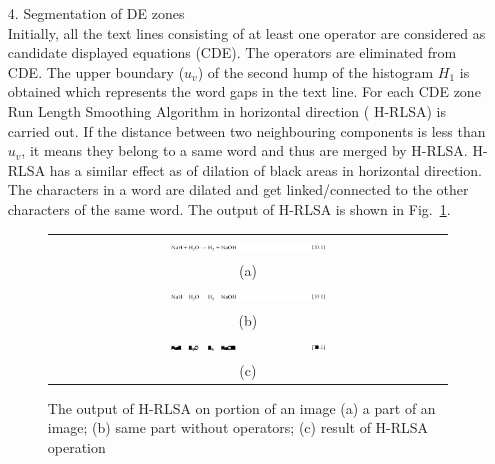 \documentclass[12pt]{IEEEtran}
\begin{document}
\begin{itemize}
\item[4.]{Segmentation of DE zones}\\
Initially, all the text lines consisting of at least one operator are considered as candidate displayed equations (CDE).
The operators are eliminated from CDE. The upper boundary ($u_v$) of the second hump of the histogram $H_1$ is obtained
which represents the word gaps in the text line. For each CDE zone Run Length Smoothing Algorithm  in horizontal direction (  H-RLSA) is 
carried out. If the distance between two neighbouring
components is less than $u_v$, it means they belong to a same word and thus are merged by H-RLSA.
H-RLSA has a similar effect as of dilation of black areas in horizontal direction. The characters
in a word are dilated and get linked/connected to the other characters of the same word. The output of
H-RLSA is shown in Fig.~\ref{h-rlsa}.
% 


\begin{figure}[h]\center\footnotesize
\begin{tabular}{|c|}
\hline
 \includegraphics[width=0.4\textwidth]{line.png} \\
 (a)\\ \hline
 \includegraphics[width=0.4\textwidth]{linewithoutOP.png} \\
 (b) \\ \hline
 \includegraphics[width=0.4\textwidth]{lineClosed.png}\\ 
 (c) \\\hline
 \end{tabular} 
 \caption{The output of H-RLSA on portion of an image (a) a part of an image;
 (b) same part without operators; (c) result of H-RLSA operation }
 \label{h-rlsa}
\end{figure}


\end{itemize}
\end{document}
